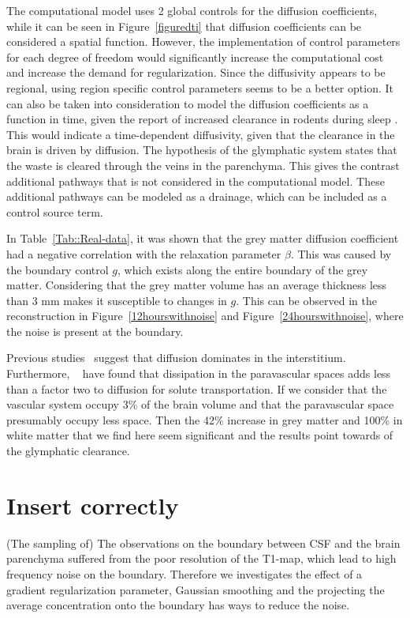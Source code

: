 \documentclass[12pt,a4paper]{article}
\begin{document}
The computational model uses 2 global controls for the diffusion coefficients, while it can be seen in  Figure~\ref{figuredti} that diffusion coefficients can be considered a spatial function. However, the implementation of control parameters for each degree of freedom would significantly increase the computational cost and increase the demand for regularization. Since the diffusivity appears to be regional, using region specific control parameters seems to be a better option.
It can also be taken into consideration to model the diffusion coefficients as a function in time, given the report of increased clearance in rodents during sleep \cite{xie2013sleep}. This would indicate a time-dependent diffusivity, given that the clearance in the brain is driven by diffusion. %
The hypothesis of the glymphatic system \cite{iliff2012paravascular} states that the waste is cleared through the veins in the parenchyma. This gives the contrast additional pathways that is not considered in the computational model. These additional pathways can be modeled as a drainage, which can be included as a control source term. 

In Table~\ref{Tab::Real-data}, it was shown that the grey matter diffusion coefficient had a negative correlation with the relaxation parameter $\beta$. This was caused by the boundary control $g$, which exists along the entire boundary of the grey matter. Considering that the grey matter volume has an average thickness less than 3 mm makes it susceptible to changes in $g$. This can be observed in the reconstruction in Figure~\ref{12hourswithnoise} and Figure~\ref{24hourswithnoise}, where the noise is present at the boundary.
  
Previous studies~\cite{holter2017interstitial, smith2017glymphatic} suggest that diffusion dominates in the interstitium. Furthermore, ~\cite{asgari2016glymphatic, brynjfm, Diem} have found that dissipation in the paravascular spaces adds less than a factor two
to diffusion for solute transportation. If we consider that the vascular system occupy 3\% of the brain volume
and that the paravascular space presumably occupy less space. Then the 42\% increase in grey matter and 100\% in white matter that we find here seem significant and the results point towards of the glymphatic clearance.  

  
  
\section{Insert correctly}
(The sampling of) The observations on the boundary between CSF and the brain parenchyma suffered from the poor resolution of the T1-map, which lead to high frequency noise on the boundary. Therefore we investigates the effect of a gradient regularization parameter, Gaussian smoothing and the projecting the average concentration onto the boundary has ways to reduce the noise. 
\end{document}
